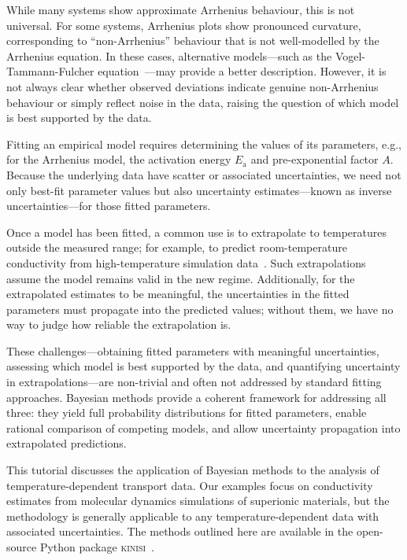 \documentclass[reprint,superscriptaddress,nobibnotes,nofootinbib,amsmath,amssymb,aps,hidelinks]{revtex4-2}
\newcommand{\Ea}{E_{\mathrm{a}}}
\begin{document}
%

While many systems show approximate Arrhenius behaviour, this is not universal. 
For some systems, Arrhenius plots show pronounced curvature, corresponding to ``non-Arrhenius'' behaviour that is not well-modelled by the Arrhenius equation. 
In these cases, alternative models---such as the Vogel-Tammann-Fulcher equation~\cite{Vogel1921, Fulcher1925, Tammann1926, deSouza2006, Wang2021}---may provide a better description. 
However, it is not always clear whether observed deviations indicate genuine non-Arrhenius behaviour or simply reflect noise in the data, raising the question of which model is best supported by the data.

Fitting an empirical model requires determining the values of its parameters, e.g., for the Arrhenius model, the activation energy $\Ea$ and pre-exponential factor $A$.
Because the underlying data have scatter or associated uncertainties, we need not only best-fit parameter values but also uncertainty estimates---known as inverse uncertainties---for those fitted parameters.

Once a model has been fitted, a common use is to extrapolate to temperatures outside the measured range; for example, to predict room-temperature conductivity from high-temperature simulation data~\cite{Yeandel2019,Goldmann2025}.
Such extrapolations assume the model remains valid in the new regime. Additionally, for the extrapolated estimates to be meaningful, the uncertainties in the fitted parameters must propagate into the predicted values; without them, we have no way to judge how reliable the extrapolation is. 

These challenges---obtaining fitted parameters with meaningful uncertainties, assessing which model is best supported by the data, and quantifying uncertainty in extrapolations---are non-trivial and often not addressed by standard fitting approaches. Bayesian methods provide a coherent framework for addressing all three: they yield full probability distributions for fitted parameters, enable rational comparison of competing models, and allow uncertainty propagation into extrapolated predictions.

This tutorial discusses the application of Bayesian methods to the analysis of temperature-dependent transport data. 
Our examples focus on conductivity estimates from molecular dynamics simulations of superionic materials, but the methodology is generally applicable to any temperature-dependent data with associated uncertainties. 
The methods outlined here are available in the open-source Python package \textsc{kinisi}~\cite{McCluskey2024}.
\end{document}
